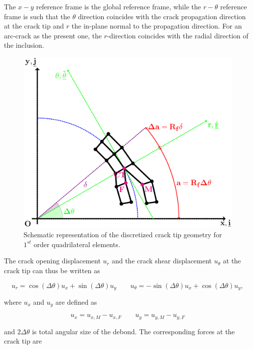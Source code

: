 The $x-y$ reference frame is the global reference frame, while the $r-\theta$ reference frame is such that the $\theta$ direction coincides with the crack propagation direction at the crack tip and $r$ the in-plane normal to the propagation direction. For an arc-crack as the present one, the $r$-direction coincides with the radial direction of the inclusion.

\begin{figure}[!h]
\includegraphics[width=\textwidth]{paperA/VCCT-linear.pdf}
\caption{Schematic representation of the discretized crack tip geometry for  $1^{st}$ order quadrilateral elements.}\label{paperA:fig:vcctlinear}
\end{figure}

The crack opening displacement $u_{r}$ and the crack shear displacement $u_{\theta}$ at the crack tip can thus be written as

\begin{equation}
u_{r}=\cos\left(\Delta\theta\right) u_{x}+\sin\left(\Delta\theta\right) u_{y}\qquad u_{\theta}=-\sin\left(\Delta\theta\right) u_{x}+\cos\left(\Delta\theta\right) u_{y},
\end{equation}

where $u_{x}$ and $u_{y}$ are defined as

\begin{equation}\label{paperA:eq:uxuy}
u_{x}=u_{x,M}-u_{x,F}\qquad u_{y}=u_{y,M}-u_{y,F}
\end{equation}

and $2\Delta\theta$ is total angular size of the debond. The corresponding forces at the crack tip are

